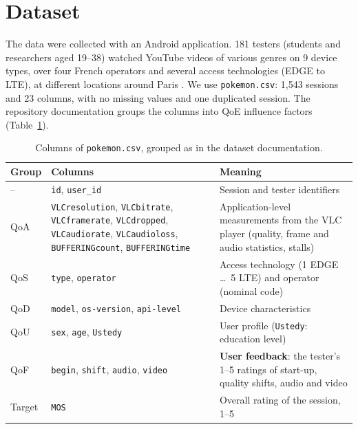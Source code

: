 \documentclass[11pt,a4paper]{article}
\newcommand{\code}[1]{\texttt{#1}}
\begin{document}
\section{Dataset}
The data were collected with an Android application. 181 testers (students and researchers aged 19--38)
watched YouTube videos of various genres on 9 device types, over four French operators and several
access technologies (EDGE to LTE), at different locations around Paris \citep{poqemon_repo}. We use
\code{pokemon.csv}: 1{,}543 sessions and 23 columns, with no missing values and one duplicated session.
The repository documentation groups the columns into QoE influence factors (Table~\ref{tab:features}).

\begin{table}[ht]
  \centering\small
  \caption{Columns of \code{pokemon.csv}, grouped as in the dataset documentation.}
  \label{tab:features}
  \begin{tabular}{lp{5.6cm}p{6.4cm}}
    \toprule
    Group & Columns & Meaning \\
    \midrule
    -- & \code{id}, \code{user\_id} & Session and tester identifiers \\
    QoA & \code{VLCresolution}, \code{VLCbitrate}, \code{VLCframerate}, \code{VLCdropped},
          \code{VLCaudiorate}, \code{VLCaudioloss}, \code{BUFFERINGcount}, \code{BUFFERINGtime}
        & Application-level measurements from the VLC player (quality, frame and audio statistics, stalls) \\
    QoS & \code{type}, \code{operator} & Access technology (1 EDGE \dots\ 5 LTE) and operator (nominal code) \\
    QoD & \code{model}, \code{os-version}, \code{api-level} & Device characteristics \\
    QoU & \code{sex}, \code{age}, \code{Ustedy} & User profile (\code{Ustedy}: education level) \\
    QoF & \code{begin}, \code{shift}, \code{audio}, \code{video}
        & \textbf{User feedback}: the tester's 1--5 ratings of start-up, quality shifts, audio and video \\
    Target & \code{MOS} & Overall rating of the session, 1--5 \\
    \bottomrule
  \end{tabular}
\end{table}

\end{document}
